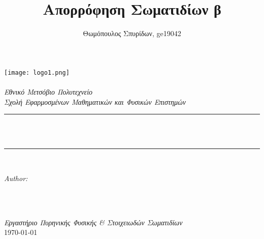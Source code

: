 \documentclass[a4paper]{article}
\title{Απορρόφηση Σωματιδίων β}
\author{Θωμόπουλος Σπυρίδων, ge19042}
\begin{document}
\pagestyle{fancy}
\fancyhead{}
\fancyfoot{}
\fancyfoot[CE,CO]{\thepage}

%	

\begin{titlepage}




\newcommand{\HRule}{\rule{\linewidth}{0.5mm}}
\texttt{[image: logo1.png]}\\[1cm] 
\center 
\quad\\[1.5cm]
\textsl{\Large Εθνικό Μετσόβιο Πολυτεχνείο}\\[0.5cm] 
\textsl{\large Σχολή Εφαρμοσμένων Μαθηματικών και Φυσικών Επιστημών}\\[0.5cm] 
\makeatletter
\HRule \\[0.4cm]
{ \huge \bfseries \@title}\\[0.4cm] 
\HRule \\[1.5cm]
\begin{minipage}{0.4\textwidth}
\begin{flushleft} \large
\emph{Author:}\\
\@author 
\end{flushleft}
\end{minipage}
~
\begin{minipage}{0.4\textwidth}
\begin{flushright} \large

\end{flushright}
\end{minipage}\\[3cm]
\makeatother
{\large \emph{Εργαστήριο Πυρηνικής Φυσικής \& Στοιχειωδών Σωματιδίων}}\\[0.5cm]
{\large \today}\\[2cm] 
\vfill 



\end{titlepage}
\end{document}
